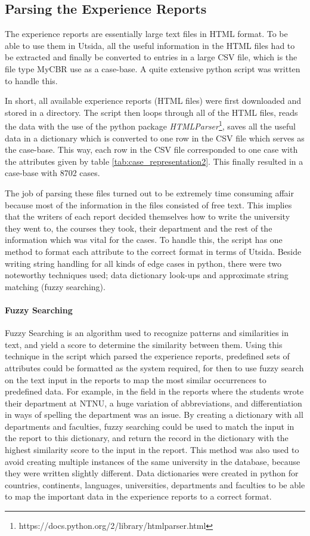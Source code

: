 \subsection{Parsing the Experience Reports}\label{sec:parsing_experience_reports}
The experience reports are essentially large text files in HTML format. To be able to use them in Utsida, all the useful information in the HTML files had to be extracted and finally be converted to entries in a large CSV file, which is the file type MyCBR use as a case-base. A quite extensive python script was written to handle this.

In short, all available experience reports (HTML files) were first downloaded and stored in a directory. The script then loops through all of the HTML files, reads the data with the use of the python package \emph{HTMLParser}\footnote{https://docs.python.org/2/library/htmlparser.html}, saves all the useful data in a dictionary which is converted to one row in the CSV file which serves as the case-base. This way, each row in the CSV file corresponded to one case with the attributes given by table \ref{tab:case_representation2}. This finally resulted in a case-base with 8702 cases.

The job of parsing these files turned out to be extremely time consuming affair because most of the information in the files consisted of free text. This implies that the writers of each report decided themselves how to write the university they went to, the courses they took, their department and the rest of the information which was vital for the cases. To handle this, the script has one method to format each attribute to the correct format in terms of Utsida. Beside writing string handling for all kinds of edge cases in python, there were two noteworthy techniques used; data dictionary look-ups and approximate string matching (fuzzy searching).


\paragraph{Fuzzy Searching}
Fuzzy Searching is an algorithm used to recognize patterns and similarities in text, and yield a score to determine the similarity between them. Using this technique in the script which parsed the experience reports, predefined sets of attributes could be formatted as the system required, for then to use fuzzy search on the text input in the reports to map the most similar occurrences to predefined data. For example, in the field in the reports where the students wrote their department at NTNU, a huge variation of abbreviations, and differentiation in ways of spelling the department was an issue. By creating a dictionary with all departments and faculties, fuzzy searching could be used to match the input in the report to this dictionary, and return the record in the dictionary with the highest similarity score to the input in the report. This method was also used to avoid creating multiple instances of the same university in the database, because they were written slightly different. Data dictionaries were created in python for countries, continents, languages, universities, departments and faculties to be able to map the important data in the experience reports to a correct format.

